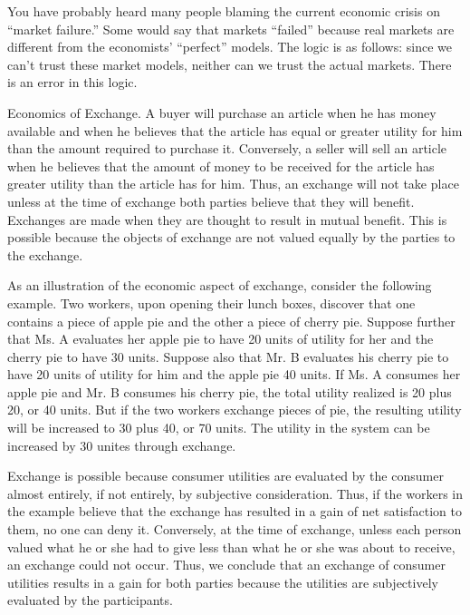 You have probably heard many people blaming the current economic crisis on ``market failure.'' Some would say that markets ``failed'' because real markets are different from the economists’ ``perfect'' models. The logic is as follows: since we can’t trust these market models, neither can we trust the actual markets. There is an error in this logic.

Economics of Exchange. A buyer will purchase an article when he has money available and when he believes that the article has equal or greater utility for him than the amount required to purchase it. Conversely, a seller will sell an article when he believes that the amount of money to be received for the article has greater utility than the article has for him. Thus, an exchange will not take place unless at the time of exchange both parties believe that they will benefit. Exchanges are made when they are thought to result in mutual benefit. This is possible because the objects of exchange are not valued equally by the parties to the exchange.

As an illustration of the economic aspect of exchange, consider the following example. Two workers, upon opening their lunch boxes, discover that one contains a piece of apple pie and the other a piece of cherry pie. Suppose further that Ms. A evaluates her apple pie to have 20 units of utility for her and the cherry pie to have 30 units. Suppose also that Mr. B evaluates his cherry pie to have 20 units of utility for him and the apple pie 40 units. If Ms. A consumes her apple pie and Mr. B consumes his cherry pie, the total utility realized is 20 plus 20, or 40 units. But if the two workers exchange pieces of pie, the resulting utility will be increased to 30 plus 40, or 70 units. The utility in the system can be increased by 30 unites through exchange.

Exchange is possible because consumer utilities are evaluated by the consumer almost entirely, if not entirely, by subjective consideration. Thus, if the workers in the example believe that the exchange has resulted in a gain of net satisfaction to them, no one can deny it. Conversely, at the time of exchange, unless each person valued what he or she had to give less than what he or she was about to receive, an exchange could not occur. Thus, we conclude that an exchange of consumer utilities results in a gain for both parties because the utilities are subjectively evaluated by the participants.

